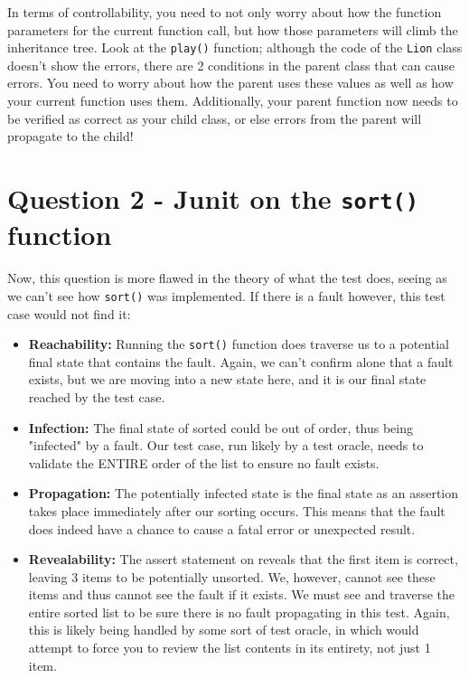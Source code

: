 \documentclass{article}
\begin{document}
In terms of controllability, you need to not only worry about how the
function parameters for the current function call, but how those
parameters will climb the inheritance tree. Look at the
\texttt{play()} function; although the code of the \texttt{Lion} class
doesn't show the errors, there are 2 conditions in the parent class
that can cause errors. You need to worry about how the parent uses
these values as well as how your current function uses them.
Additionally, your parent function now needs to be verified as correct
as your child class, or else errors from the parent will propagate to
the child!

\section{Question 2 - Junit on the \texttt{sort()} function}

Now, this question is more flawed in the theory of what the test does,
seeing as we can't see how \texttt{sort()} was implemented. If there
is a fault however, this test case would not find it:

\begin{itemize}

    \item \textbf{Reachability:} Running the \texttt{sort()} function
        does traverse us to a potential final state that contains the
        fault. Again, we can't confirm alone that a fault exists, but
        we are moving into a new state here, and it is our final state
        reached by the test case.
    \item \textbf{Infection:} The final state of sorted could be out
        of order, thus being "infected" by a fault. Our test case, run
        likely by a test oracle, needs to validate the ENTIRE order of
        the list to ensure no fault exists.
    \item \textbf{Propagation:} The potentially infected state is the
        final state as an assertion takes place immediately after our
        sorting occurs. This means that the fault does indeed have a
        chance to cause a fatal error or unexpected result.
    \item \textbf{Revealability:} The assert statement on reveals that
        the first item is correct, leaving 3 items to be potentially
        unsorted. We, however, cannot see these items and thus cannot
        see the fault if it exists. We must see and traverse the
        entire sorted list to be sure there is no fault propagating in
        this test. Again, this is likely being handled by some sort of
        test oracle, in which would attempt to force you to review the
        list contents in its entirety, not just 1 item.

\end{itemize}
\end{document}
